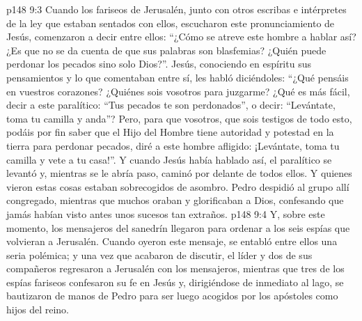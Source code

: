 \vs p148 9:3 Cuando los fariseos de Jerusalén, junto con otros escribas e intérpretes de la ley que estaban sentados con ellos, escucharon este pronunciamiento de Jesús, comenzaron a decir entre ellos: “¿Cómo se atreve este hombre a hablar así? ¿Es que no se da cuenta de que sus palabras son blasfemias? ¿Quién puede perdonar los pecados sino solo Dios?”. Jesús, conociendo en espíritu sus pensamientos y lo que comentaban entre sí, les habló diciéndoles: “¿Qué pensáis en vuestros corazones? ¿Quiénes sois vosotros para juzgarme? ¿Qué es más fácil, decir a este paralítico: “Tus pecados te son perdonados”, o decir: “Levántate, toma tu camilla y anda”? Pero, para que vosotros, que sois testigos de todo esto, podáis por fin saber que el Hijo del Hombre tiene autoridad y potestad en la tierra para perdonar pecados, diré a este hombre afligido: ¡Levántate, toma tu camilla y vete a tu casa!”. Y cuando Jesús había hablado así, el paralítico se levantó y, mientras se le abría paso, caminó por delante de todos ellos. Y quienes vieron estas cosas estaban sobrecogidos de asombro. Pedro despidió al grupo allí congregado, mientras que muchos oraban y glorificaban a Dios, confesando que jamás habían visto antes unos sucesos tan extraños.
\vs p148 9:4 \pc Y, sobre este momento, los mensajeros del sanedrín llegaron para ordenar a los seis espías que volvieran a Jerusalén. Cuando oyeron este mensaje, se entabló entre ellos una seria polémica; y una vez que acabaron de discutir, el líder y dos de sus compañeros regresaron a Jerusalén con los mensajeros, mientras que tres de los espías fariseos confesaron su fe en Jesús y, dirigiéndose de inmediato al lago, se bautizaron de manos de Pedro para ser luego acogidos por los apóstoles como hijos del reino.
